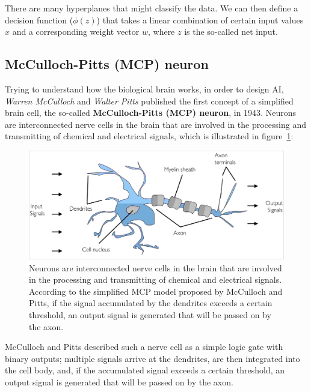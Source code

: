 \documentclass[11pt]{article}
\begin{document}
    There are many hyperplanes that might classify the data.
    We can then define a decision function ($\phi(z)$) that takes a linear combination of certain input values $x$ and a corresponding weight vector $w$, where $z$ is the so-called net input.

    \subsection{McCulloch-Pitts (MCP) neuron} \label{subsec:mcp}

    Trying to understand how the biological brain works, in order to design AI, \textit{Warren McCulloch} and \textit{Walter Pitts} published the first concept of a simplified brain cell, the so-called \textbf{McCulloch-Pitts (MCP) neuron}, in 1943\cite{McCulloch1990a}.
    Neurons are interconnected nerve cells in the brain that are involved in the processing and transmitting of chemical and electrical signals, which is illustrated in figure~\ref{fig:neuron}:

    \begin{figure}[hbt!]
        \centering
        \includegraphics[width=1\linewidth,trim=0.5 0.5 0.5 0.5,clip]{img/neuron.jpg}
        \caption{Neurons are interconnected nerve cells in the brain that are involved in the processing and transmitting of chemical and electrical signals.
        According to the simplified MCP model proposed by McCulloch and Pitts, if the signal accumulated by the dendrites exceeds a certain threshold, an output signal is generated that will be passed on by the axon.}
        \label{fig:neuron}
    \end{figure}

    McCulloch and Pitts described such a nerve cell as a simple logic gate with binary outputs;
    multiple signals arrive at the dendrites, are then integrated into the cell body, and, if the accumulated signal exceeds a certain threshold, an output signal is generated that will be passed on by the axon.
\end{document}
